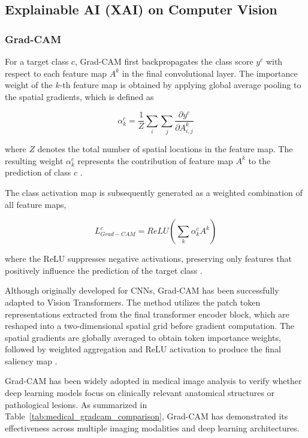 \documentclass[conference]{IEEEtran}
\begin{document}
\subsection{Explainable AI (XAI) on Computer Vision}

\subsubsection{Grad-CAM}

For a target class $c$, Grad-CAM first backpropagates the class score $y^c$ with respect to each feature map $A^k$ in the final convolutional layer. The importance weight of the $k$-th feature map is obtained by applying global average pooling to the spatial gradients, which is defined as

\begin{equation}
\alpha_{k}^{c} = \frac{1}{Z} \sum_{i} \sum_{j} \frac{\partial y^{c}}{\partial A_{i,j}^{k}}
\label{eq:grad_cam_weights}
\end{equation}

where $Z$ denotes the total number of spatial locations in the feature map. The resulting weight $\alpha_k^c$ represents the contribution of feature map $A^k$ to the prediction of class $c$ \cite{Selvaraju2020}.

The class activation map is subsequently generated as a weighted combination of all feature maps,

\begin{equation}
    L_{Grad-CAM}^{c} = ReLU (\sum_{k} \alpha_{k}^{c} A^{k})
    \label{eq:grad_cam_activation_map}
\end{equation}

where the ReLU suppresses negative activations, preserving only features that positively influence the prediction of the target class \cite{Selvaraju2020}.

Although originally developed for CNNs, Grad-CAM has been successfully adapted to Vision Transformers. The method utilizes the patch token representations extracted from the final transformer encoder block, which are reshaped into a two-dimensional spatial grid before gradient computation. The spatial gradients are globally averaged to obtain token importance weights, followed by weighted aggregation and ReLU activation to produce the final saliency map \cite{Alhafdhi2026, Vanitha2025}.

Grad-CAM has been widely adopted in medical image analysis to verify whether deep learning models focus on clinically relevant anatomical structures or pathological lesions. As summarized in Table~\ref{tab:medical_gradcam_comparison}, Grad-CAM has demonstrated its effectiveness across multiple imaging modalities and deep learning architectures.
\end{document}
